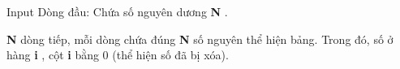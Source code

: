 Input
Dòng đầu: Chứa số nguyên dương   \textbf{    N   }   .  

\textbf{    N   }   dòng tiếp, mỗi dòng chứa đúng   \textbf{    N   }   số nguyên thể hiện bảng. Trong đó, số ở hàng   \textbf{    i   }   , cột   \textbf{    i   }   bằng 0 (thể hiện số đã bị xóa).